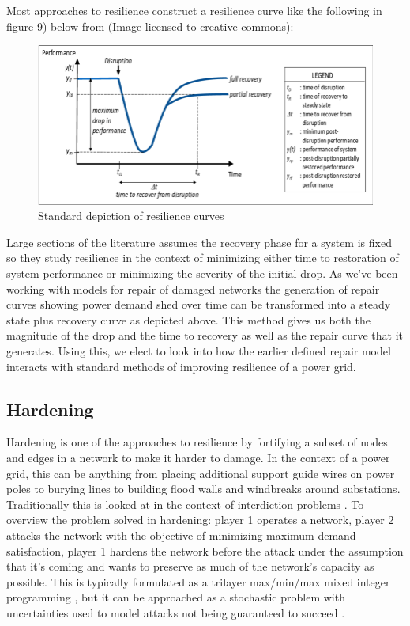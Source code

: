 \documentclass{article}
\begin{document}
	Most approaches to resilience construct a resilience curve like the following in figure 9) below from \cite{Madni2020} (Image licensed to creative commons):
	
	\begin{figure}[htbp]
	\centering
	\includegraphics[width=.9\linewidth]{resiliencecurve.png}
	\caption{Standard depiction of resilience curves}
	\end{figure}
	
	Large sections of the literature assumes the recovery phase for a system is fixed so they study resilience in the context of minimizing either time to restoration of system performance or minimizing the severity of the initial drop. As we've been working with models for repair of damaged networks the generation of repair curves showing power demand shed over time can be transformed into a steady state plus recovery curve as depicted above. This method gives us both the magnitude of the drop and the time to recovery as well as the repair curve that it generates. Using this, we elect to look into how the earlier defined repair model interacts with standard methods of improving resilience of a power grid.
	
	\subsection{Hardening}
	
	Hardening is one of the approaches to resilience by fortifying a subset of nodes and edges in a network to make it harder to damage. In the context of a power grid, this can be anything from placing additional support guide wires on power poles to burying lines to building flood walls and windbreaks around substations. Traditionally this is looked at in the context of interdiction problems \cite{ChurchEA2007}. To overview the problem solved in hardening: player 1 operates a network, player 2 attacks the network with the objective of minimizing maximum demand satisfaction, player 1 hardens the network before the attack under the assumption that it's coming and wants to preserve as much of the network's capacity as possible. This is typically formulated as a trilayer max/min/max mixed integer programming \cite{Mahmoo2016}, but it can be approached as a stochastic problem with uncertainties used to model attacks not being guaranteed to succeed \cite{Ramirez2009}.
	
\end{document}
